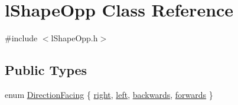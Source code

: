 \hypertarget{classl_shape_opp}{\section{l\-Shape\-Opp Class Reference}
\label{classl_shape_opp}
}


{\ttfamily \#include $<$l\-Shape\-Opp.\-h$>$}

\subsection*{Public Types}
\begin{DoxyCompactItemize}
\item 
enum \hyperlink{classl_shape_opp_a6b47570c2f406d7399c38fcf2104a2ec}{Direction\-Facing} \{ \hyperlink{classl_shape_opp_a6b47570c2f406d7399c38fcf2104a2eca6bd81b7efd6e38d818b0b129628b2f95}{right}, 
\hyperlink{classl_shape_opp_a6b47570c2f406d7399c38fcf2104a2ecab03d6287b7d65c227a57f99d92d3cf79}{left}, 
\hyperlink{classl_shape_opp_a6b47570c2f406d7399c38fcf2104a2ecae0ab6b2e2cf7bb35f3b83a67334a4a8d}{backwards}, 
\hyperlink{classl_shape_opp_a6b47570c2f406d7399c38fcf2104a2eca9e0d9616c0633da2f474db26d5e6a042}{forwards}
 \}
\end{DoxyCompactItemize}
